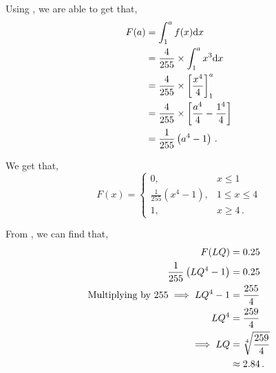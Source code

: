 \begin{subquestions}
\begin{subsubquestions}
	
\subsubquestion

Using , we are able to get that,
\begin{align}
	F(a) & = \int_{1}^{a} f(x)\mathrm{d}x \nonumber \\
	     & = \frac{4}{255} \times \int_{1}^{a} x^3\mathrm{d}x \nonumber \\
	     & = \frac{4}{255} \times \left[\frac{x^4}{4}\right]^a_1 \nonumber \\
	     & = \frac{4}{255} \times \left[\frac{a^4}{4} - \frac{1^4}{4} \right] \nonumber \\
	     & = \frac{1}{255}\left(a^4 - 1 \right) \,.
\end{align}
	
We get that,
\[ F(x) = \begin{cases} 
	0 , & x\leq 1 \\
	\frac{1}{255}\left(x^4 - 1 \right), & 1 \leq x \leq 4 \\
	1, & x \geq 4 \,.
\end{cases}
\]


\subsubquestion

From , we can find that,
\begin{align}
	F(LQ) & = 0.25 \nonumber \\
	\frac{1}{255}\left(LQ^4 - 1 \right) & = 0.25 \nonumber \\
	\text{Multiplying by 255} \implies LQ^4 - 1 & = \frac{255}{4} \nonumber \\
	LQ^4 & = \frac{259}{4} \nonumber \\
	\implies LQ & = \sqrt[4]{\frac{259}{4}} \nonumber \\
	           & \approx 2.84 \,. 
\end{align}	

\end{subsubquestions}
	
\end{subquestions}
